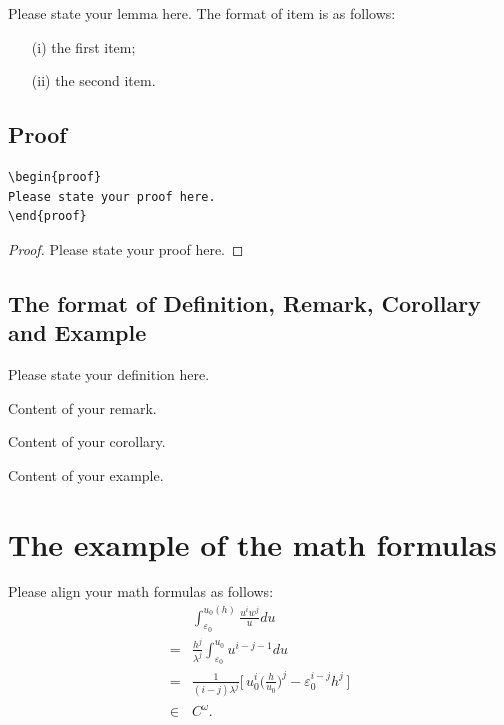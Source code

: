 \documentclass{jaac}
\begin{document}
 \begin{lemma}
 \label{le1}
  Please state your lemma here. The format of item is as follows:
\begin{itemize}
\item[(i)] the first item;
\item[(ii)] the second item.
\end{itemize}
\end{lemma}

 \subsection{Proof}

\begin{verbatim}
\begin{proof}
Please state your proof here.
\end{proof}
 \end{verbatim}


\begin{proof}
Please state your proof here.
\end{proof}


\subsection{The format of Definition, Remark,  Corollary and Example}
\begin{definition}\label{de1} Please state your definition here.\end{definition}

\begin{remark}\label{re1} Content of your remark.\end{remark}

\begin{corollary}\label{co1}Content of your corollary.\end{corollary}

\begin{example}\label{ex1}Content of your example.\end{example}




\section{The example of the math formulas}
Please align your math formulas as follows:
\begin{align*}
&\int_{\varepsilon_{0}}^{u_{0}(h)}\frac{u^{i}w^{j}}{u}du\\
=&\frac{h^{j}}{\lambda^{j}}\int_{\varepsilon_{0}}^{u_{0}}u^{i-j-1}du\\
=&\frac{1}{(i-j)\lambda^{j}}\Big[\,u_{0}^{i}\big(\frac{h}{u_{0}}\big)^{j}-\varepsilon_{0}^{i-j}h^{j}\,\Big] \\
\in& C^{\omega}.
\end{align*}
\end{document}
